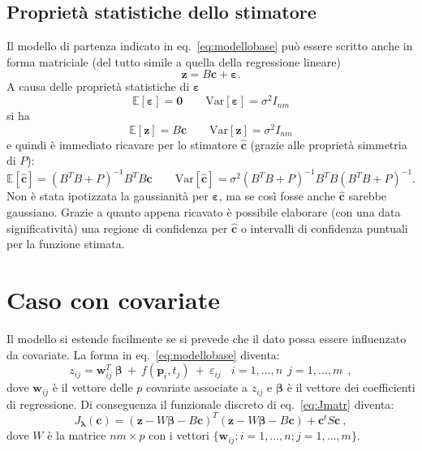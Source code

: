 \documentclass[a4paper,11pt,twoside,openright]{book}							%
\begin{document}
\subsection{Proprietà statistiche dello stimatore}
Il modello di partenza indicato in eq.~\eqref{eq:modellobase} può essere scritto anche in forma matriciale (del tutto simile a quella della regressione lineare)
\begin{equation}
\label{eq:modellobasematric}
\bm z=B \bm c + \bm \varepsilon .
\end{equation}
A causa delle proprietà statistiche di $\bm \varepsilon$
$$
\mathbb{E}[\bm \varepsilon] = \bm 0 \qquad \mathrm{Var}[\bm \varepsilon] = \sigma^2 I_{nm}
$$
si ha
$$
\mathbb{E}[\bm z] = B \bm c \qquad \mathrm{Var}[\bm z] = \sigma^2 I_{nm}
$$
e quindi è immediato ricavare per lo stimatore $\hat  {\bm c}$ (grazie alle proprietà simmetria di $P$):
$$
\mathbb{E}[\hat  {\bm c}] = (B^T B + P)^{-1}B^TB \bm c \qquad \mathrm{Var}[\hat  {\bm c}] = \sigma^2 (B^T B + P)^{-1}B^TB(B^T B + P)^{-1} .
$$
Non è stata ipotizzata la gaussianità per $\bm \varepsilon$, ma se così fosse anche $\hat  {\bm c}$ sarebbe gaussiano. Grazie a quanto appena ricavato è possibile elaborare (con una data significatività) una regione di confidenza per $\hat  {\bm c}$ o intervalli di confidenza puntuali per la funzione stimata.


\section{Caso con covariate}
\label{sez:beta}
Il modello si estende facilmente se si prevede che il dato possa essere influenzato da covariate. La forma in eq.~\eqref{eq:modellobase} diventa:
\begin{equation}
\label{eq:modellobasecovar}
z_{ij}= \bm w_{ij}^T\  \bm \beta   \ + \  f(\bm p_i,t_j)\ +\ \varepsilon_{ij}\ \ \ \ i = 1,\ldots,n\ \ j=1,\ldots,m \ \ ,
\end{equation}
dove $\bm w_{ij}$ è il vettore delle $p$ covariate associate a $z_{ij}$ e $\bm \beta$ è il vettore dei coefficienti di regressione. Di conseguenza il funzionale discreto di eq.~\eqref{eq:Jmatr} diventa:
$$ J_{\bm \lambda }(\bm c) = (\bm z - W \bm \beta - B \bm c)^T (\bm z - W \bm \beta - B \bm c) + \bm c^t S \bm c  \ ,$$
dove $W$ è la matrice $nm \times p$ con i vettori $ \{\bm w_{ij}; i=1,\ldots,n;j=1,\ldots,m\}$.
\end{document}
